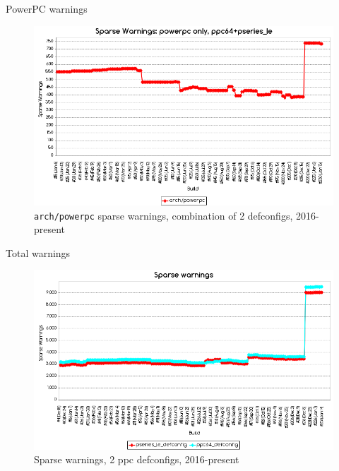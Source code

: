\documentclass[pdf,aspectratio=169]{beamer}
\begin{document}
\begin{frame}{PowerPC warnings}
  \begin{figure}[h!]
    \centering
    \includegraphics[scale=0.35]{warnings-ppc}
    \caption{\texttt{arch/powerpc} sparse warnings, combination of 2 defconfigs, 2016-present}
    \label{fig:arch-powerpc-warnings-no-spike}
  \end{figure}
\end{frame}

\begin{frame}{Total warnings}
  \begin{figure}[h!]
    \centering
    \includegraphics[scale=0.35]{warnings-total.png}
    \caption{Sparse warnings, 2 ppc defconfigs, 2016-present}
    \label{fig:sparse-warnings-no-spike}
  \end{figure}
\end{frame}
\end{document}
